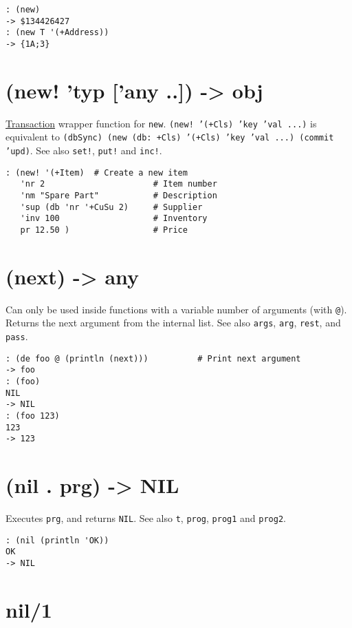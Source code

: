 {{{{{{{\begin{verbatim}
: (new)
-> $134426427
: (new T '(+Address))
-> {1A;3}
\end{verbatim}

 
\section{(new! 'typ ['any ..]) -> obj}
\label{sec-8-1-14-11}


\hyperref[ref.html-trans]{Transaction} wrapper function for \texttt{new}.
\texttt{(new! '(+Cls) 'key 'val ...)} is equivalent to
\texttt{(dbSync) (new (db: +Cls) '(+Cls) 'key 'val ...) (commit 'upd)}. See
also \texttt{set!}, \texttt{put!} and \texttt{inc!}.


\begin{verbatim}
: (new! '(+Item)  # Create a new item
   'nr 2                      # Item number
   'nm "Spare Part"           # Description
   'sup (db 'nr '+CuSu 2)     # Supplier
   'inv 100                   # Inventory
   pr 12.50 )                 # Price
\end{verbatim}

 
\section{(next) -> any}
\label{sec-8-1-14-12}


Can only be used inside functions with a variable number of arguments
(with \texttt{@}). Returns the next argument from the internal list. See also
\texttt{args}, \texttt{arg}, \texttt{rest}, and \texttt{pass}.


\begin{verbatim}
: (de foo @ (println (next)))          # Print next argument
-> foo
: (foo)
NIL
-> NIL
: (foo 123)
123
-> 123
\end{verbatim}

 
\section{(nil . prg) -> NIL}
\label{sec-8-1-14-13}


Executes \texttt{prg}, and returns \texttt{NIL}. See also \texttt{t}, \texttt{prog}, \texttt{prog1} and
\texttt{prog2}.


\begin{verbatim}
: (nil (println 'OK))
OK
-> NIL
\end{verbatim}

 
\section{nil/1}
\label{sec-8-1-14-14}


}}}}}}}
